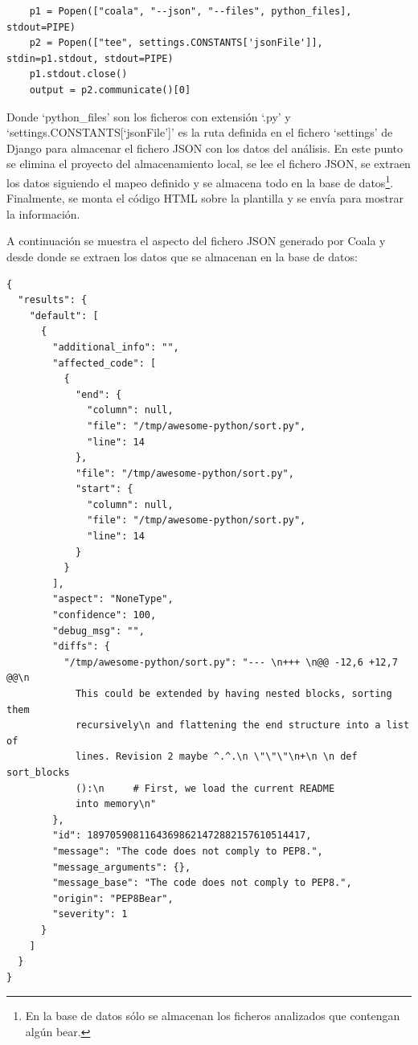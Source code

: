 \documentclass[a4paper, 12pt]{book}
\begin{document}
{\footnotesize
\begin{verbatim}
    p1 = Popen(["coala", "--json", "--files", python_files], stdout=PIPE)
    p2 = Popen(["tee", settings.CONSTANTS['jsonFile']], stdin=p1.stdout, stdout=PIPE)
    p1.stdout.close()
    output = p2.communicate()[0]
\end{verbatim}
}

Donde `python\_files' son los ficheros con extensión `.py' y `settings.CONSTANTS[`jsonFile']' es la ruta definida en el fichero `settings' de Django para almacenar el fichero JSON con los datos del análisis. En este punto se elimina el proyecto del almacenamiento local, se lee el fichero JSON, se extraen los datos siguiendo el mapeo definido y se almacena todo en la base de datos\footnote{En la base de datos sólo se almacenan los ficheros analizados que contengan algún bear.}. Finalmente, se monta el código HTML sobre la plantilla y se envía para mostrar la información.

A continuación se muestra el aspecto del fichero JSON generado por Coala y desde donde se extraen los datos que se almacenan en la base de datos:

{\footnotesize
\begin{verbatim}
{
  "results": {
    "default": [
      {
        "additional_info": "",
        "affected_code": [
          {
            "end": {
              "column": null,
              "file": "/tmp/awesome-python/sort.py",
              "line": 14
            },
            "file": "/tmp/awesome-python/sort.py",
            "start": {
              "column": null,
              "file": "/tmp/awesome-python/sort.py",
              "line": 14
            }
          }
        ],
        "aspect": "NoneType",
        "confidence": 100,
        "debug_msg": "",
        "diffs": {
          "/tmp/awesome-python/sort.py": "--- \n+++ \n@@ -12,6 +12,7 @@\n     
            This could be extended by having nested blocks, sorting them 
            recursively\n and flattening the end structure into a list of 
            lines. Revision 2 maybe ^.^.\n \"\"\"\n+\n \n def sort_blocks
            ():\n     # First, we load the current README 
            into memory\n"
        },
        "id": 18970590811643698621472882157610514417,
        "message": "The code does not comply to PEP8.",
        "message_arguments": {},
        "message_base": "The code does not comply to PEP8.",
        "origin": "PEP8Bear",
        "severity": 1
      }
    ]
  }
}
\end{verbatim}
}
\end{document}
